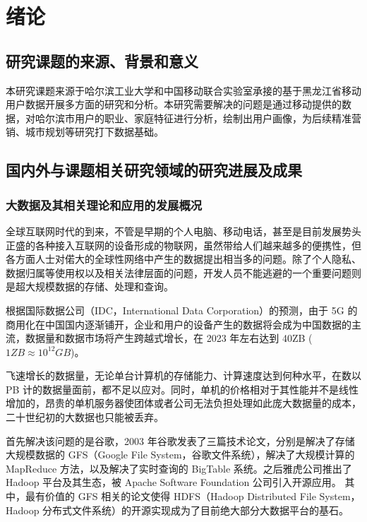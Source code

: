 
\chapter{绪论}

\section{研究课题的来源、背景和意义}

本研究课题来源于哈尔滨工业大学和中国移动联合实验室承接的基于黑龙江省移动用户数据开展多方面的研究和分析。本研究需要解决的问题是通过移动提供的数据，对哈尔滨市用户的职业、家庭特征进行分析，绘制出用户画像，为后续精准营销、城市规划等研究打下数据基础。

\section{国内外与课题相关研究领域的研究进展及成果}

\subsection{大数据及其相关理论和应用的发展概况}
\label{sec:bd_dev}

全球互联网时代的到来，不管是早期的个人电脑、移动电话，甚至是目前发展势头正盛的各种接入互联网的设备形成的物联网，虽然带给人们越来越多的便携性，但各方面人士对偌大的全球性网络中产生的数据提出相当多的问题。除了个人隐私、数据归属等使用权以及相关法律层面的问题，开发人员不能逃避的一个重要问题则是超大规模数据的存储、处理和查询。

根据国际数据公司（IDC，International Data Corporation）的预测\cite{data_count}，由于 5G 的商用化在中国国内逐渐铺开，企业和用户的设备产生的数据将会成为中国数据的主流，数据量和数据市场将产生跨越式增长，在 2023 年左右达到 40ZB ($1ZB \approx 10^{12}GB$)。

飞速增长的数据量，无论单台计算机的存储能力、计算速度达到何种水平，在数以 PB 计的数据量面前，都不足以应对。同时，单机的价格相对于其性能并不是线性增加的，昂贵的单机服务器使团体或者公司无法负担处理如此庞大数据量的成本，二十世纪初的大数据也只能被丢弃。

首先解决该问题的是谷歌，2003 年谷歌发表了三篇技术论文\cite{gfs}，分别是解决了存储大规模数据的 GFS（Google File System，谷歌文件系统），解决了大规模计算的 MapReduce 方法，以及解决了实时查询的 BigTable 系统。之后雅虎公司推出了 Hadoop 平台及其生态，被 Apache Software Foundation 公司引入开源应用。 其中，最有价值的 GFS 相关的论文使得 HDFS（Hadoop Distributed File System，Hadoop 分布式文件系统）的开源实现成为了目前绝大部分大数据平台的基石。

